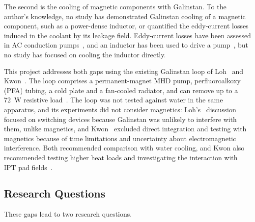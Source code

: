 The second is the cooling of magnetic components with Galinstan. To the author's
knowledge, no study has demonstrated Galinstan cooling of a magnetic component,
such as a power-dense inductor, or quantified the eddy-current losses induced in
the coolant by its leakage field. Eddy-current losses have been assessed in AC
conduction pumps~\cite{fan_ultra-efficient_2026}, and an inductor has been used to drive a
pump~\cite{fan_ultra-efficient_2026,fan_liquid_2021}, but no study has focused on cooling the inductor 
directly.

This project addresses both gaps using the existing Galinstan loop of
Loh~\cite{loh_project_2025} and Kwon~\cite{kwon_project_2025}. The loop comprises a
permanent-magnet MHD pump, perfluoroalkoxy (PFA) tubing, a cold plate and a
fan-cooled radiator, and can remove up to a \SI{72}{\watt} resistive
load~\cite{kwon_project_2025,loh_project_2025}. The loop was not tested against water
in the same apparatus, and its experiments did not consider magnetics:
Loh's~\cite{loh_project_2025} discussion focused on switching devices because Galinstan was
unlikely to interfere with them, unlike magnetics, and Kwon~\cite{kwon_project_2025}
excluded direct integration and testing with magnetics because of time
limitations and uncertainty about electromagnetic interference. Both recommended
comparison with water cooling, and Kwon also recommended testing higher heat
loads and investigating the interaction with IPT pad
fields~\cite{kwon_project_2025,loh_project_2025}.

\subsection{Research Questions}
\label{sec:research-questions}

These gaps lead to two research questions.

